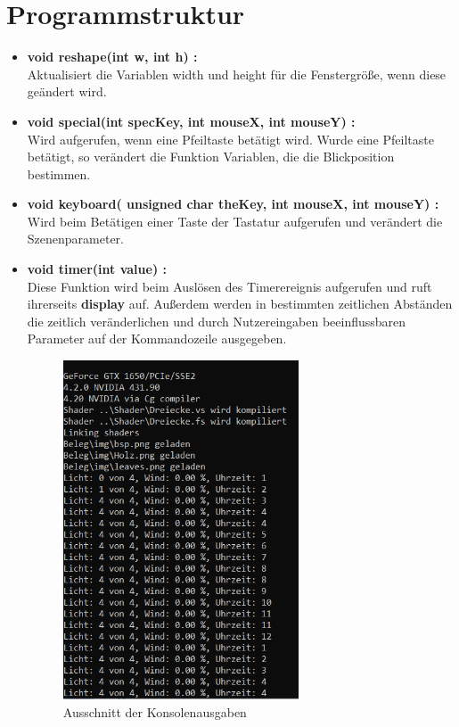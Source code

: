 \documentclass{scrartcl}
\begin{document}
\section{Programmstruktur}

\begin{itemize}
	\item \textbf{void reshape(int w, int h) :} \\
	Aktualisiert die Variablen width und height für die Fenstergröße, wenn diese geändert wird.

	\item \textbf{void special(int specKey, int mouseX, int mouseY) :} \\
	Wird aufgerufen, wenn eine Pfeiltaste betätigt wird. Wurde eine Pfeiltaste betätigt, so verändert die Funktion Variablen, die die Blickposition bestimmen.
	
	\item \textbf{void keyboard( unsigned char theKey, int mouseX, int mouseY) :} \\
	Wird beim Betätigen einer Taste der Tastatur aufgerufen und verändert die Szenenparameter.

	\item \textbf{void timer(int value) :} \\
	Diese Funktion wird beim Auslösen des Timerereignis aufgerufen und ruft ihrerseits \textbf{display} auf.
	Außerdem werden in bestimmten zeitlichen Abständen die zeitlich veränderlichen und durch Nutzereingaben beeinflussbaren Parameter auf der Kommandozeile ausgegeben. 
	
	\begin{figure}[h]
 		\centering
 		\includegraphics[width=7cm]{5.png}
 		\caption{Ausschnitt der Konsolenausgaben}
	\end{figure}


\end{itemize}
\end{document}

